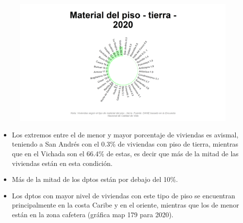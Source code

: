     \begin{figure}[H]
        \caption[Viviendas con piso de tierra por departamentos para 2020 ]{\label{piso_tierra_dptos} }
        \begin{center}
        \includegraphics[width=\textwidth,keepaspectratio]{img/var_179_static.png}
        \end{center}
    \end{figure}
            \begin{itemize}
                    \item Los extremos entre el de menor y mayor porcentaje de viviendas es avismal, teniendo a San Andrés con el 0.3\% de viviendas con piso de tierra, mientras que en el Vichada son el 66.4\% de estas, es decir que más de la mitad de las viviendas están en esta condición.
                    \item Más de la mitad de los dptos están por debajo del 10\%.
                    \item Los dptos con mayor nivel de viviendas con este tipo de piso se encuentran principalmente en la costa Caribe y en el oriente, mientras que los de menor están en la zona cafetera (gráfica map 179 para 2020).
                    \end{itemize}


